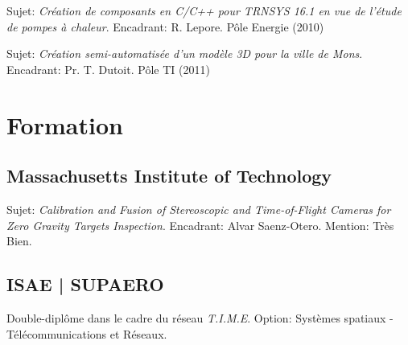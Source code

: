 \documentclass[a4paper]{deedy-resume} %
\begin{document}
\begin{minipage}[t]{0.74\textwidth}

\begin{tightitemize}
	\item Sujet: \textit{Création de composants en C/C++ pour TRNSYS 16.1 en vue de l’étude de pompes à chaleur}. Encadrant: R. Lepore. Pôle Energie (2010)
	\item Sujet: \textit{Création semi-automatisée d'un modèle 3D pour la ville de Mons}. Encadrant: Pr. T. Dutoit. Pôle TI (2011)
\end{tightitemize}
	



\section{Formation}

\subsection{Massachusetts Institute of Technology}
\vspace{2pt}
Sujet: \textit{Calibration and Fusion of Stereoscopic and Time-of-Flight Cameras for Zero Gravity Targets Inspection}. Encadrant: Alvar Saenz-Otero. Mention: Très Bien.

\sectionspace %


\subsection{ISAE | SUPAERO}
\vspace{2pt}
Double-diplôme dans le cadre du réseau \textit{T.I.M.E}.  Option: Systèmes spatiaux - Télécommunications et Réseaux.

\sectionspace %



\end{minipage}
\end{document}
